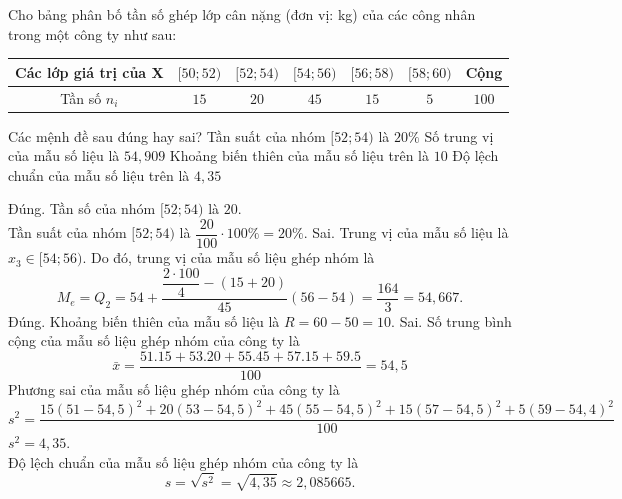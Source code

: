 \begin{ex}%
	Cho bảng phân bố tần số ghép lớp cân nặng (đơn vị: kg) của các công nhân trong một công ty như sau:
	\begin{center}
		\begin{tabular}{|c|c|c|c|c|c|c|}
			\hline Các lớp giá trị của X & {$[50 ; 52)$} & {$[52 ; 54)$} & {$[54 ; 56)$} & {$[56 ; 58)$} & {$[58 ; 60)$} & Cộng \\
			\hline Tần số $n_i$ & $15$ & $20$ & $45$ & $15$ & $5$ & $100$ \\
			\hline
		\end{tabular}
	\end{center}
	Các mệnh đề sau đúng hay sai?
	\choiceTF
	{\True Tần suất của nhóm $[52;54)$ là $20\%$}
	{Số trung vị của mẫu số liệu là $54,909$}
	{\True Khoảng biến thiên của mẫu số liệu trên là $10$}
	{Độ lệch chuẩn của mẫu số liệu trên là $4,35$}
	\loigiai
	{
		\begin{itemchoice}
			\itemch Đúng. Tần số của nhóm $[52 ; 54)$ là $20$.\\
			Tần suất của nhóm $[52 ; 54)$ là $\dfrac{20}{100} \cdot 100 \%=20 \%$.
			\itemch  Sai. Trung vị của mẫu số liệu là $x_3 \in[54 ; 56)$. Do đó, trung vị của mẫu số liệu ghép nhóm là
			$$
			M_e=Q_2=54+\dfrac{\dfrac{2 \cdot 100}{4}-(15+20)}{45}(56-54)=\dfrac{164}{3}=54,667.
			$$
			\itemch Đúng.  Khoảng biến thiên của mẫu số liệu là $R=60-50=10$.
			\itemch Sai. Số trung bình cộng của mẫu số liệu ghép nhóm của công ty là
			$$
			\bar{x}=\dfrac{51.15+53.20+55.45+57.15+59.5}{100}=54,5
			$$
			Phương sai của mẫu số liệu ghép nhóm của công ty là
			$$
			s^2=\frac{15 (51-54,5)^2+20(53-54,5)^2+45(55-54,5)^2+15(57-54,5)^2+5(59-54,4)^2}{100}
			$$
			$s^2=4,35$.\\
			Độ lệch chuẩn của mẫu số liệu ghép nhóm của công ty là $$s=\sqrt{s^2}=\sqrt{4,35} \approx 2,085665.$$
		\end{itemchoice}
	}
\end{ex}

